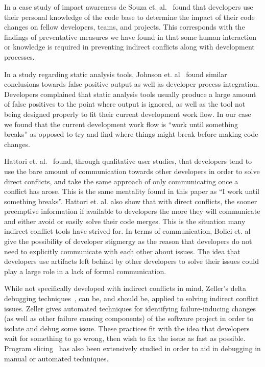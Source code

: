 \documentclass[conference]{IEEEtran}
\begin{document}
In a case study of impact awareness de Souza et. al.~\cite{deSouza:2008:ESS} found that developers use their personal knowledge of the
code base to determine the impact of their code changes on fellow developers, teams, and projects. This corresponds with the findings of
preventative measures we have found in that some human interaction or knowledge is required in preventing indirect conflicts along with
development processes.

In a study regarding static analysis tools, Johnson et. al~\cite{Johnson:2013:WDS} found similar conclusions towards false positive output
as well as developer process integration. Developers complained that static analysis tools usually produce a large amount of false
positives to the point where output is ignored, as well as the tool not being designed properly to fit their current development work
flow. In our case we found that the current development work flow is ``work until something breaks'' as opposed to try and find where things
might break before making code changes.

Hattori et. al.~\cite{Hattori:2012:ICG} found, through qualitative user studies, that developers tend to use the bare amount of communication
towards other developers in order to solve direct conflicts, and take the same approach of only communicating once a conflict has arose. This
is the same mentality found in this paper as ``I work until something breaks''. Hattori et. al. also show that with direct conflicts, the
sooner preemptive information if available to developers the more they will communicate and either avoid or easily solve their code merges.
This is the situation many indirect conflict tools have strived for. In terms of communication, Bolici et. al~\cite{Bolici:2009} give the 
possibility of developer stigmergy as the reason that developers do not need to explicitly communicate with each other about issues. The idea
that developers use artifacts left behind by other developers to solve their issues could play a large role in a lack of formal communication.

While not specifically developed with indirect conflicts in mind, Zeller's delta debugging techniques~\cite{Zeller:2005:WPF}, 
can be, and should be, applied to solving indirect conflict issues. Zeller gives automated techniques for identifying failure-inducing
changes (as well as other failure causing components) of the software project in order to isolate and debug some issue. These practices fit
with the idea that developers wait for something to go wrong, then wish to fix the issue as fast as possible. Program slicing~\cite{Xu:2005:BSP}
has also been extensively studied in order to aid in debugging in manual or automated techniques.
\end{document}
